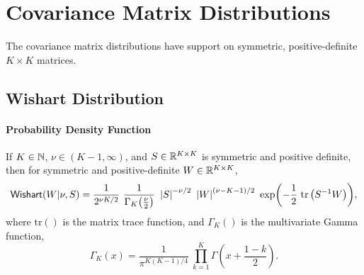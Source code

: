 





\chapter{Covariance Matrix Distributions}

\noindent
The covariance matrix distributions have support on symmetric,
positive-definite $K \times K$ matrices.


\section{Wishart Distribution}

\subsubsection{Probability Density Function}

If $K \in \nats$, $\nu \in (K-1,\infty)$, and $S \in \reals^{K \times K}$ is symmetric
and positive definite, then for symmetric and positive-definite $W \in
\reals^{K \times K}$,
\[
\distro{Wishart}(W|\nu,S)
=
\frac{1}{2^{\nu K / 2}}
\
\frac{1}{\Gamma_K \! \left( \frac{\nu}{2} \right)}
\
\left| S \right|^{-\nu/2}
\
\left| W \right|^{(\nu - K - 1)/2}
\
\exp \! \left(- \frac{1}{2} \ \mbox{tr}\left( S^{-1} W \right) \right)
\! ,
\]
%
where $\mbox{tr}()$ is the matrix trace function, and $\Gamma_K()$ is
the multivariate Gamma function,
\[
\Gamma_K(x) = 
\frac{1}{\pi^{K(K-1)/4}}
\
\prod_{k=1}^K \Gamma \left( x + \frac{1 - k}{2} \right)
\!.
\]

